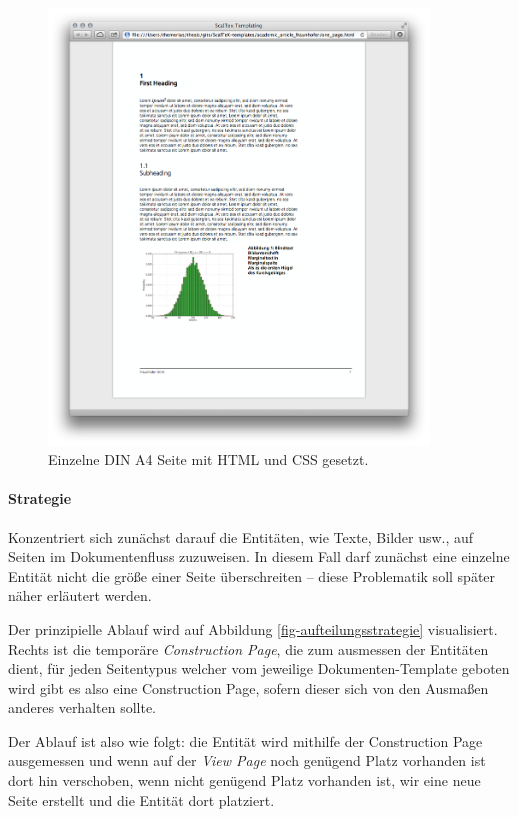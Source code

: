 \newpage
\begin{figure}[h!]
  \centering
    \includegraphics[width=0.9\textwidth]{figures/one_page.png}
  \caption{Einzelne DIN A4 Seite mit HTML und CSS gesetzt.}\label{fig-one_page}
\end{figure}
\newpage

\paragraph{Strategie}
Konzentriert sich zunächst darauf die Entitäten, wie Texte, Bilder usw.,
auf Seiten im Dokumentenfluss zuzuweisen. In diesem Fall darf zunächst eine
einzelne Entität nicht die größe einer Seite überschreiten -- diese
Problematik soll später näher erläutert werden.

Der prinzipielle Ablauf wird auf Abbildung \ref{fig-aufteilungsstrategie}
visualisiert. Rechts ist die temporäre \emph{Construction Page}, die zum
ausmessen der Entitäten dient, für jeden Seitentypus welcher vom jeweilige
Dokumenten-Template geboten wird gibt es also eine Construction Page, sofern
dieser sich von den Ausmaßen anderes verhalten sollte.

Der Ablauf ist also wie folgt: die Entität wird mithilfe der Construction
Page ausgemessen und wenn auf der \emph{View Page} noch genügend Platz
vorhanden ist dort hin verschoben, wenn nicht genügend Platz vorhanden ist,
wir eine neue Seite erstellt und die Entität dort platziert.

